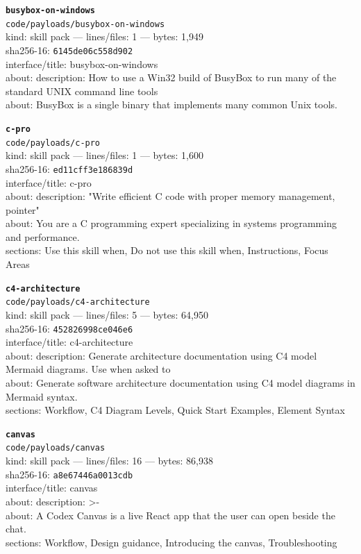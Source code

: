 \noindent\textbf{\texttt{busybox-on-windows}}\\
\texttt{code/payloads/busybox-on-windows}\\
kind: skill pack --- lines/files: 1 --- bytes: 1,949\\
sha256-16: \texttt{6145de06c558d902}\\
interface/title: busybox-on-windows\\
about: description: How to use a Win32 build of BusyBox to run many of the standard UNIX command line tools\\
about: BusyBox is a single binary that implements many common Unix tools.\\
\vspace*{6.0pt}

\noindent\textbf{\texttt{c-pro}}\\
\texttt{code/payloads/c-pro}\\
kind: skill pack --- lines/files: 1 --- bytes: 1,600\\
sha256-16: \texttt{ed11cff3e186839d}\\
interface/title: c-pro\\
about: description: "Write efficient C code with proper memory management, pointer"\\
about: You are a C programming expert specializing in systems programming and performance.\\
sections: Use this skill when, Do not use this skill when, Instructions, Focus Areas\\
\vspace*{6.0pt}

\noindent\textbf{\texttt{c4-architecture}}\\
\texttt{code/payloads/c4-architecture}\\
kind: skill pack --- lines/files: 5 --- bytes: 64,950\\
sha256-16: \texttt{452826998ce046e6}\\
interface/title: c4-architecture\\
about: description: Generate architecture documentation using C4 model Mermaid diagrams. Use when asked to \\
about: Generate software architecture documentation using C4 model diagrams in Mermaid syntax.\\
sections: Workflow, C4 Diagram Levels, Quick Start Examples, Element Syntax\\
\vspace*{6.0pt}
\newpage

\noindent\textbf{\texttt{canvas}}\\
\texttt{code/payloads/canvas}\\
kind: skill pack --- lines/files: 16 --- bytes: 86,938\\
sha256-16: \texttt{a8e67446a0013cdb}\\
interface/title: canvas\\
about: description: >-\\
about: A Codex Canvas is a live React app that the user can open beside the chat.\\
sections: Workflow, Design guidance, Introducing the canvas, Troubleshooting\\
\vspace*{6.0pt}

